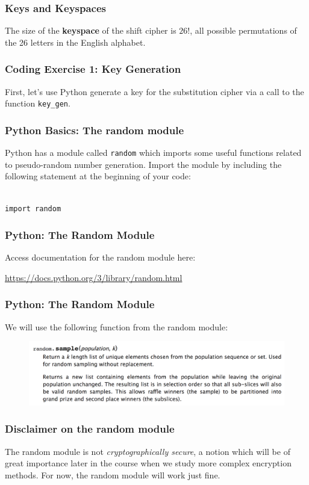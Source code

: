 \documentclass{beamer}
\newcommand{\<}{\langle}
\renewcommand{\>}{\rangle}
\begin{document}
\begin{frame}
\frametitle{Keys and Keyspaces}

The size of the \textbf{keyspace} of the shift cipher is $26!$, all possible permutations of the 26 letters in the English alphabet. 
\end{frame}

\begin{frame}[fragile]
\frametitle{Coding Exercise 1: Key Generation}

First, let's use Python generate a key for the substitution cipher via a call to the function \verb|key_gen|.
\end{frame}

\begin{frame}[fragile]
\frametitle{Python Basics: The random module}

Python has a module called \verb=random= which imports some useful functions related to pseudo-random number generation. Import the module by including the following statement at the beginning of your code:
\begin{verbatim}

import random
\end{verbatim}
\end{frame}


\begin{frame}[fragile]
\frametitle{Python: The Random Module}

Access documentation for the random module here: 

\url{https://docs.python.org/3/library/random.html}
\end{frame}


\begin{frame}[fragile]
\frametitle{Python: The Random Module}

We will use the following function from the random module:
\begin{figure}
\includegraphics[scale=.4]{IMG/sample.png}
\end{figure}
\end{frame}


\begin{frame}[fragile]
\frametitle{Disclaimer on the random module}

The random module is not \emph{cryptographically secure}, a notion which will be of great importance later in the course when we study more complex encryption methods. For now, the random module will work just fine. 
\end{frame}
\end{document}
